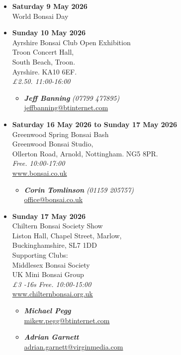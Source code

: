 \begin{itemize}
    \item \textbf{Saturday 9 May 2026}
    \\
    World Bonsai Day

    \item \textbf{Sunday 10 May 2026}
    \\
    Ayrshire Bonsai Club Open Exhibition \\
    Troon Concert Hall, \\
    South Beach, Troon. \\
    Ayrshire. KA10 6EF.
    \\
    \emph{£2.50. 11:00-16:00}
    \begin{itemize}
        \item \textbf{\emph{Jeff Banning}} \emph{(07799 477895)} \\
        \href{mailto:jeffbanning@btinternet.com}{jeffbanning@btinternet.com} 
    \end{itemize}

    \item \textbf{Saturday 16 May 2026 to Sunday 17 May 2026}
    \\
    Greenwood Spring Bonsai Bash \\
    Greenwood Bonsai Studio, \\
    Ollerton Road, Arnold, Nottingham. NG5 8PR.
    \\
    \emph{Free. 10:00-17:00}
    \\
    \href{https://www.bonsai.co.uk}{www.bonsai.co.uk}
    \begin{itemize}
        \item \textbf{\emph{Corin Tomlinson}} \emph{(01159 205757)} \\
        \href{mailto:office@bonsai.co.uk}{office@bonsai.co.uk} 
    \end{itemize}

    \item \textbf{Sunday 17 May 2026}
    \\
    Chiltern Bonsai Society Show \\
    Liston Hall, Chapel Street, Marlow, \\
    Buckinghamshire, SL7 1DD \\
    Supporting Clubs: \\
    Middlesex Bonsai Society \\
    UK Mini Bonsai Group
    \\
    \emph{£3 -16s Free. 10:00-15:00}
    \\
    \href{https://www.chilternbonsai.org.uk}{www.chilternbonsai.org.uk}
    \begin{itemize}
        \item \textbf{\emph{Michael Pegg}} \\
        \href{mailto:mikew.pegg@btinternet.com}{mikew.pegg@btinternet.com} 
        \item \textbf{\emph{Adrian Garnett}} \\
        \href{mailto:adrian.garnett@virginmedia.com}{adrian.garnett@virginmedia.com} 
    \end{itemize}


\end{itemize}
